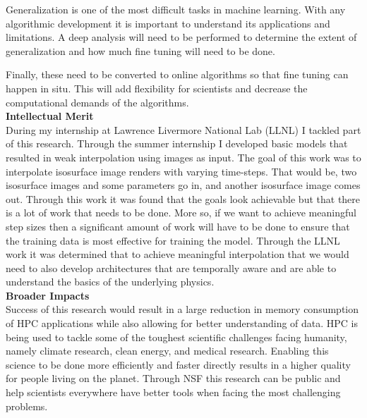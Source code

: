 \documentclass[12pt]{article}
\begin{document}
\noindent
Generalization is one of the most difficult tasks in machine learning. With any
algorithmic development it is important to understand its applications and
limitations. A deep analysis will need to be performed to determine the extent
of generalization and how much fine tuning will need to be done. 

\noindent
Finally, these need to be converted to online algorithms so that fine tuning can
happen in situ. This will add flexibility for scientists and decrease the
computational demands of the algorithms. 
\\
\noindent
\textbf{Intellectual Merit}
\\\noindent
During my internship at Lawrence Livermore National Lab (LLNL) I tackled part of
this research. Through the summer internship I developed basic models that
resulted in weak interpolation using images as input. The goal of this work was
to interpolate isosurface image renders with varying time-steps. That would be,
two isosurface images and some parameters go in, and another isosurface image
comes out. Through this work it was found that the goals look achievable but
that there is a lot of work that needs to be done. More so, if we want to
achieve meaningful step sizes then a significant amount of work will have to be
done to ensure that the training data is most effective for training the model.
Through the LLNL work it was determined that to achieve meaningful interpolation
that we would need to also develop architectures that are temporally aware and
are able to understand the basics of the underlying physics. 
%
\\\textbf{Broader Impacts} 
\\\noindent
Success of this research would result in a large reduction in memory consumption
of HPC applications while also allowing for better understanding of data. HPC is
being used to tackle some of the toughest scientific challenges facing humanity,
namely climate research, clean energy, and medical research. Enabling this
science to be done more efficiently and faster directly results in a higher
quality for people living on the planet. Through NSF this research can be public
and help scientists everywhere have better tools when facing the most
challenging problems.


\footnotesize


%
%
\end{document}
